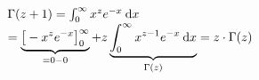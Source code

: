 \item $\Gamma(z+1) = \int_0^\infty x^z e^{-x} \:\mathrm{d}{x}$ \\
 $= \underbrace{\big[ -x^z e^{-x}\big]_{0}^{\infty}}_{=0-0} + z \underbrace{\int_0^\infty x^{z-1}e^{-x}\:\mathrm{d}{x}}_{\Gamma(z)} = z\cdot\Gamma(z)$

